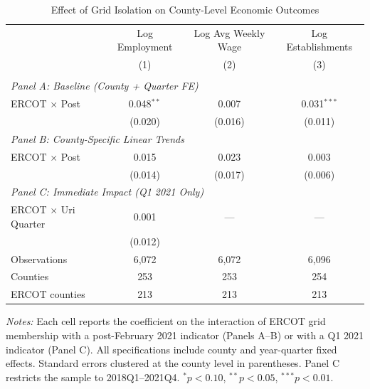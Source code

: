 \begin{table}[htbp]
\centering
\caption{Effect of Grid Isolation on County-Level Economic Outcomes}
\label{tab:main_did}
\begin{tabular}{lccc}
\hline\hline
 & Log Employment & Log Avg Weekly Wage & Log Establishments \\
 & (1) & (2) & (3) \\
\hline
\\[-6pt]
\multicolumn{4}{l}{\textit{Panel A: Baseline (County + Quarter FE)}} \\[3pt]
ERCOT $\times$ Post & 0.048$^{**}$ & 0.007 & 0.031$^{***}$ \\
 & (0.020) & (0.016) & (0.011) \\[6pt]
\multicolumn{4}{l}{\textit{Panel B: County-Specific Linear Trends}} \\[3pt]
ERCOT $\times$ Post & 0.015 & 0.023 & 0.003 \\
 & (0.014) & (0.017) & (0.006) \\[6pt]
\multicolumn{4}{l}{\textit{Panel C: Immediate Impact (Q1 2021 Only)}} \\[3pt]
ERCOT $\times$ Uri Quarter & 0.001 & --- & --- \\
 & (0.012) & & \\[3pt]
\hline
Observations & 6,072 & 6,072 & 6,096 \\
Counties & 253 & 253 & 254 \\
ERCOT counties & 213 & 213 & 213 \\
\hline\hline
\end{tabular}
\begin{tablenotes}
\small
\item \textit{Notes:} Each cell reports the coefficient on the interaction of ERCOT grid membership with a post-February 2021 indicator (Panels A--B) or with a Q1 2021 indicator (Panel C). All specifications include county and year-quarter fixed effects. Standard errors clustered at the county level in parentheses. Panel C restricts the sample to 2018Q1--2021Q4. $^{*}p<0.10$, $^{**}p<0.05$, $^{***}p<0.01$.
\end{tablenotes}
\end{table}

